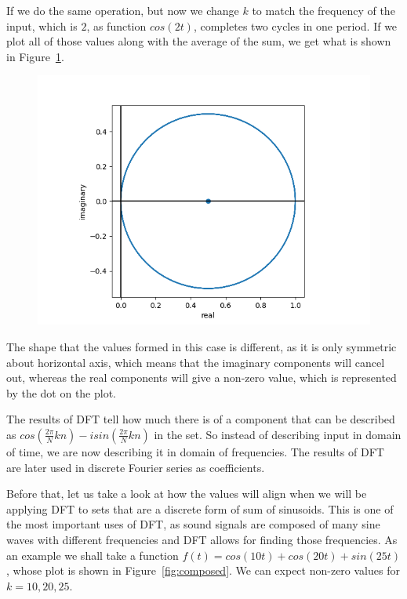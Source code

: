 \documentclass[titlepage]{article}
\begin{document}
    If we do the same operation, but now we change $k$ to match the frequency of
    the input, which is $2$, as function $cos(2t)$, completes two cycles in 
    one period. If we plot all of those values
    along with the average of the sum, we get what is shown in 
    Figure~\ref{fig:cos_wrapped_2k}.
    \begin{figure}[H]
        \caption{}
        \centering
        \includegraphics[width=0.4\linewidth]{cos_wrapped_2k}
        \label{fig:cos_wrapped_2k}
    \end{figure}
    The shape that the values formed in this case is different, as it is only 
    symmetric about horizontal axis, which means that the imaginary components 
    will cancel out, whereas the real components will give a non-zero value, 
    which is represented by the dot on the plot.


    The results of DFT tell how much there is of a component that can be described as
    $cos\left(\frac{2\pi}{N}kn\right) - isin\left( \frac{2\pi}{N}kn\right)$  
    in the set. So instead of describing input in domain of time, we are now 
    describing it in domain of frequencies.
    The results of DFT are later used in discrete Fourier series as
    coefficients.


    Before that, let us take a look at how the values will align when we will
    be applying
    DFT to sets that are a discrete form of sum of sinusoids. This is one of the 
    most important uses of DFT, as sound signals are composed of many sine waves 
    with different frequencies and DFT allows for finding those frequencies. 
    As an example we shall take a function $f(t) = cos(10t) + cos(20t) + sin(25t)$, 
    whose plot is shown in Figure~\ref{fig:composed}. We can expect non-zero 
    values for $k = {10,20,25}$.
\end{document}
